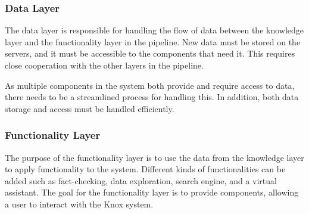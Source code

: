 \subsubsection{Data Layer}\label{databaseResponsibility}
The data layer is responsible for handling the flow of data between the knowledge layer and the functionality layer in the \knox{} pipeline.
New data must be stored on the servers, and it must be accessible to the components that need it. 
This requires close cooperation with the other layers in the pipeline.


As multiple components in the \knox{} system both provide and require access to data, there needs to be a streamlined process for handling this.
In addition, both data storage and access must be handled efficiently.

\subsubsection{Functionality Layer}
The purpose of the functionality layer is to use the data from the knowledge layer to apply functionality to the system.
Different kinds of functionalities can be added such as fact-checking, data exploration, search engine, and a virtual assistant.
 The goal for the functionality layer is to provide components, allowing a user to interact with the Knox system. 
